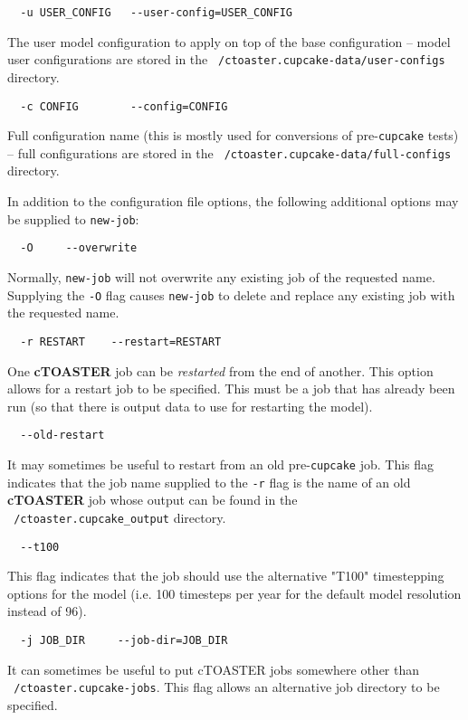 \documentclass[a4paper,10pt,article]{memoir}
\begin{document}
\begin{verbatim}
  -u USER_CONFIG   --user-config=USER_CONFIG
\end{verbatim}
The user model configuration to apply on top of the base configuration
-- model user configurations are stored in the
\texttt{~/ctoaster.cupcake-data/user-configs} directory.

\begin{verbatim}
  -c CONFIG        --config=CONFIG
\end{verbatim}
Full configuration name (this is mostly used for conversions of
pre-\texttt{cupcake} tests) -- full configurations are stored in the
\texttt{~/ctoaster.cupcake-data/full-configs} directory.

In addition to the configuration file options, the following
additional options may be supplied to \texttt{new-job}:

\begin{verbatim}
  -O     --overwrite
\end{verbatim}
Normally, \texttt{new-job} will not overwrite any existing job of the
requested name.  Supplying the \texttt{-O} flag causes
\texttt{new-job} to delete and replace any existing job with the
requested name.

\begin{verbatim}
  -r RESTART    --restart=RESTART
\end{verbatim}
One \textbf{cTOASTER} job can be \emph{restarted} from the end of another.  This
option allows for a restart job to be specified.  This must be a job
that has already been run (so that there is output data to use for
restarting the model).

\begin{verbatim}
  --old-restart
\end{verbatim}
It may sometimes be useful to restart from an old pre-\texttt{cupcake}
job.  This flag indicates that the job name supplied to the
\texttt{-r} flag is the name of an old \textbf{cTOASTER} job whose output can be
found in the 
\\\texttt{~/ctoaster.cupcake\_output} directory.

\begin{verbatim}
  --t100
\end{verbatim}
This flag indicates that the job should use the alternative "T100"
timestepping options for the model (i.e. 100 timesteps per year for
the default model resolution instead of 96).

\begin{verbatim}
  -j JOB_DIR     --job-dir=JOB_DIR
\end{verbatim}
It can sometimes be useful to put cTOASTER jobs somewhere other than
\texttt{~/ctoaster.cupcake-jobs}.  This flag allows an alternative job directory
to be specified.
\end{document}
